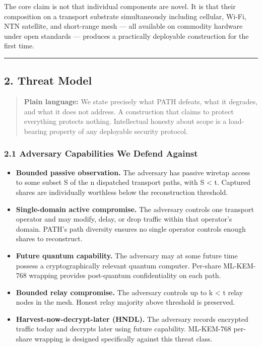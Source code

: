 \documentclass[
  11pt,
]{article}
\providecommand{\tightlist}{%
  \setlength{\itemsep}{0pt}\setlength{\parskip}{0pt}}
\begin{document}
The core claim is not that individual components are novel. It is that
their composition on a transport substrate simultaneously including
cellular, Wi-Fi, NTN satellite, and short-range mesh --- all available
on commodity hardware under open standards --- produces a practically
deployable construction for the first time.

\begin{center}\rule{0.5\linewidth}{0.5pt}\end{center}

\hypertarget{threat-model}{%
\subsection{2. Threat Model}\label{threat-model}}

\begin{quote}
\textbf{Plain language:} We state precisely what PATH defeats, what it
degrades, and what it does not address. A construction that claims to
protect everything protects nothing. Intellectual honesty about scope is
a load-bearing property of any deployable security protocol.
\end{quote}

\hypertarget{adversary-capabilities-we-defend-against}{%
\subsubsection{2.1 Adversary Capabilities We Defend
Against}\label{adversary-capabilities-we-defend-against}}

\begin{itemize}
\tightlist
\item
  \textbf{Bounded passive observation.} The adversary has passive
  wiretap access to some subset S of the n dispatched transport paths,
  with \textbar S\textbar{} \textless{} t. Captured shares are
  individually worthless below the reconstruction threshold.
\item
  \textbf{Single-domain active compromise.} The adversary controls one
  transport operator and may modify, delay, or drop traffic within that
  operator's domain. PATH's path diversity ensures no single operator
  controls enough shares to reconstruct.
\item
  \textbf{Future quantum capability.} The adversary may at some future
  time possess a cryptographically relevant quantum computer. Per-share
  ML-KEM-768 wrapping provides post-quantum confidentiality on each
  path.
\item
  \textbf{Bounded relay compromise.} The adversary controls up to k
  \textless{} t relay nodes in the mesh. Honest relay majority above
  threshold is preserved.
\item
  \textbf{Harvest-now-decrypt-later (HNDL).} The adversary records
  encrypted traffic today and decrypts later using future capability.
  ML-KEM-768 per-share wrapping is designed specifically against this
  threat class.
\end{itemize}
\end{document}
